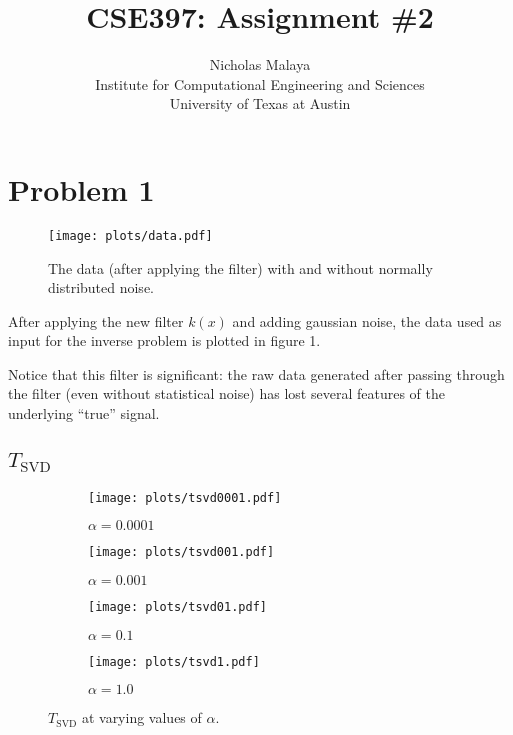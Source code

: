 \documentclass{article}
\title{\bf{CSE397: Assignment \#2}}
\author{Nicholas Malaya \\ Institute for Computational Engineering and Sciences \\ University of Texas at Austin} \date{}
\begin{document}
\maketitle

\newpage
\section{Problem 1}

\begin{figure}[!htb]
  \texttt{[image: plots/data.pdf]}
  \label{fig:data}
  \caption{The data (after applying the filter) with and without
 normally distributed noise. } 
\end{figure}

After applying the new filter $k(x)$ and adding gaussian noise, the data
used as input for the inverse problem is plotted in figure 1. 

Notice that this filter is significant: the raw data generated after
passing through the filter (even without statistical noise) has lost
several features of the underlying ``true'' signal. 

\subsection{$T_{\text{SVD}}$}


\begin{figure}[!htb]
        \centering
        \begin{subfigure}[bh]{0.45\textwidth}
                \texttt{[image: plots/tsvd0001.pdf]}
                \caption{$\alpha=0.0001$}
        \end{subfigure}%
        \begin{subfigure}[bh]{0.45\textwidth}
                \texttt{[image: plots/tsvd001.pdf]}
                \caption{$\alpha=0.001$}
        \end{subfigure}
        \centering
        \begin{subfigure}[bh]{0.45\textwidth}
                \texttt{[image: plots/tsvd01.pdf]}
                \caption{$\alpha=0.1$}
        \end{subfigure}%
        \begin{subfigure}[bh]{0.45\textwidth}
                \texttt{[image: plots/tsvd1.pdf]}
                \caption{$\alpha=1.0$}
        \end{subfigure}
        \caption{$T_{\text{SVD}}$ at varying values of $\alpha$.}
        \label{fig:svd}
\end{figure}
\end{document}
